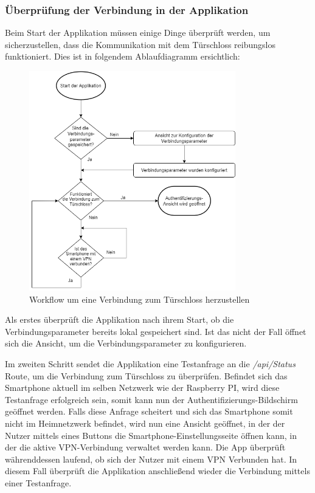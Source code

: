 \subsubsection{Überprüfung der Verbindung in der Applikation}
Beim Start der Applikation müssen einige Dinge überprüft werden, um sicherzustellen, dass die Kommunikation mit 
dem Türschloss reibungslos funktioniert. Dies ist in folgendem Ablaufdiagramm ersichtlich:
\begin{figure}[H]
    \begin{center}
        \includegraphics[width=0.8\textwidth]{images/mobile/Startup.png}
        \caption{Workflow um eine Verbindung zum Türschloss herzustellen}
    \end{center}
\end{figure}
Als erstes überprüft die Applikation nach ihrem Start, ob die Verbindungsparameter bereits lokal gespeichert sind.
Ist das nicht der Fall öffnet sich die Ansicht, um die Verbindungsparameter zu konfigurieren.

Im zweiten Schritt sendet die Applikation eine Testanfrage an die \textit{/api/Status} Route, um die Verbindung 
zum Türschloss zu überprüfen.
Befindet sich das Smartphone aktuell im selben Netzwerk wie der Raspberry PI, wird diese Testanfrage erfolgreich sein, 
somit kann nun der Authentifizierungs-Bildschirm geöffnet werden.
\pagebreak
Falls diese Anfrage scheitert und sich das Smartphone somit nicht im Heimnetzwerk befindet, 
wird nun eine Ansicht geöffnet, in der der Nutzer mittels eines Buttons
die Smartphone-Einstellungsseite öffnen kann, in der die aktive VPN-Verbindung verwaltet werden kann.
Die App überprüft währenddessen laufend, ob sich der Nutzer mit einem VPN Verbunden hat.
In diesem Fall überprüft die Applikation anschließend wieder die Verbindung mittels einer Testanfrage. 

